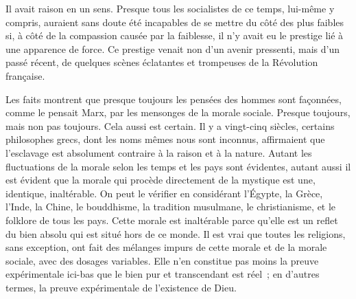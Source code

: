 \documentclass[french,twoside]{book} %
\begin{document}
Il avait raison en un sens. Presque tous les socialistes de ce temps, lui-même y compris, auraient sans doute été incapables de se mettre du côté des plus faibles si, à côté de la compassion causée par la faiblesse, il n'y avait eu le prestige lié à une apparence de force. Ce prestige venait non d'un avenir pressenti, mais d'un passé récent, de quelques scènes éclatantes et trompeuses de la Révolution française.\par
Les faits montrent que presque toujours les pensées des hommes sont façonnées, comme le pensait Marx, par les mensonges de la morale sociale. Presque toujours, mais non pas toujours. Cela aussi est certain. Il y a vingt-cinq siècles, certains philosophes grecs, dont les noms mêmes nous sont inconnus, affirmaient que l'esclavage est absolument contraire à la raison et à la nature. Autant les fluctuations de la morale selon les temps et les pays sont évidentes, autant aussi il est évident que la morale qui procède directement de la mystique est une, identique, inaltérable. On peut le vérifier en considérant l'Égypte, la Grèce, l'Inde, la Chine, le bouddhisme, la tradition musulmane, le christianisme, et le folklore de tous les pays. Cette morale est inaltérable parce qu'elle est un reflet du bien absolu qui est situé hors de ce monde. Il est vrai que toutes les religions, sans exception, ont fait des mélanges impurs de cette morale et de la morale sociale, avec des dosages variables. Elle n'en constitue pas moins la preuve expérimentale ici-bas que le bien pur et transcendant est réel ; en d'autres termes, la preuve expérimentale de l'existence de Dieu.
\end{document}
